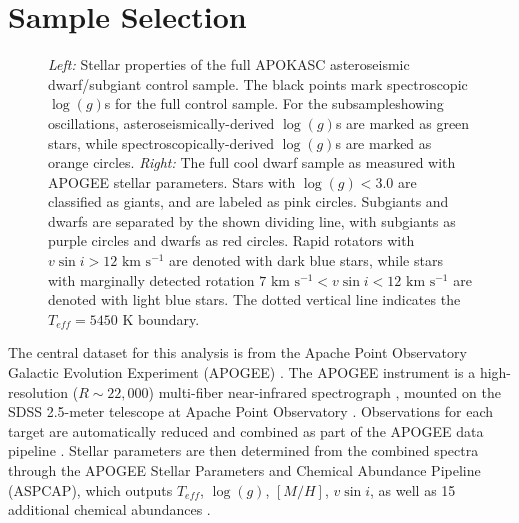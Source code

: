 \documentclass[manuscript]{aastex6}
\newcommand{\vsini}{\ensuremath{v \sin i}}
\newcommand{\Teff}{\ensuremath{T_{eff}}}
\newcommand{\logg}{\ensuremath{\log(g)}}
\newcommand{\kms}{\textrm{~km~s}\ensuremath{^{-1}}}
\begin{document}
\section{Sample Selection}
\label{sec:sample}

\begin{figure*}
    \caption{\emph{Left:} Stellar properties of the full APOKASC 
    asteroseismic dwarf/subgiant control sample. The black points mark
    spectroscopic \logg{}s for the full control sample. For the
    subsampleshowing oscillations, asteroseismically-derived \logg{}s are 
    marked as green stars, while spectroscopically-derived \logg{}s are 
    marked as orange circles. 
    \emph{Right:} The full cool dwarf sample as measured with APOGEE stellar 
    parameters. Stars with \(\logg < 3.0\) are classified as giants, and are 
    labeled as pink circles. Subgiants and dwarfs are separated by the shown 
    dividing line, with subgiants as purple circles and dwarfs as red circles. 
    Rapid rotators with \(\vsini > 12 \kms\) are denoted with dark blue stars, 
    while stars with marginally detected rotation \(7 \kms < \vsini < 12 
    \kms\) are denoted with light blue stars. The dotted vertical line 
    indicates the \(\Teff = 5450\) K boundary.\label{fig:sample}}
\end{figure*}

The central dataset for this analysis is from the Apache Point Observatory 
Galactic Evolution Experiment (APOGEE) \citep{Blanton17,Majewski17}. The
APOGEE instrument is a high-resolution (\(R \sim 22,000\)) multi-fiber 
near-infrared spectrograph \citep{Wilson10}, mounted on the SDSS 2.5-meter 
telescope at Apache Point Observatory \citep{Gunn06}. Observations for each
target are automatically reduced and combined as part of the APOGEE data 
pipeline \citep{Nidever15}. Stellar parameters are then determined from the 
combined spectra through the APOGEE Stellar Parameters and Chemical Abundance 
Pipeline (ASPCAP), which outputs \Teff{}, \logg{}, \([M/H]\), \vsini{}, as 
well as 15 additional chemical abundances \citep{GarciaPerez16}.
\end{document}
